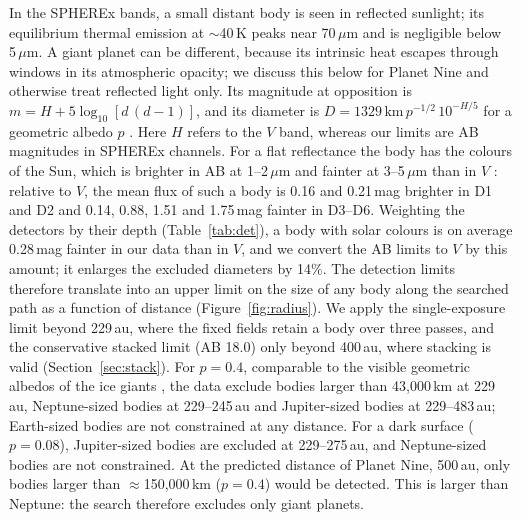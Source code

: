 \documentclass[twocolumn,linenumbers,anonymous]{aastex702}
\begin{document}
In the SPHEREx bands, a small distant body is seen in reflected sunlight; its equilibrium thermal emission at $\sim$40\,K peaks near 70\,$\mu$m and is negligible below 5\,$\mu$m. A giant planet can be different, because its intrinsic heat escapes through windows in its atmospheric opacity; we discuss this below for Planet Nine and otherwise treat reflected light only. Its magnitude at opposition is $m = H + 5\log_{10}[d\,(d - 1)]$, and its diameter is $D = 1329\,\mathrm{km}\,p^{-1/2}\,10^{-H/5}$ for a geometric albedo $p$ \citep{pravec07}. Here $H$ refers to the $V$ band, whereas our limits are AB magnitudes in SPHEREx channels. For a flat reflectance the body has the colours of the Sun, which is brighter in AB at 1--2\,$\mu$m and fainter at 3--5\,$\mu$m than in $V$ \citep{willmer18}: relative to $V$, the mean flux of such a body is 0.16 and 0.21\,mag brighter in D1 and D2 and 0.14, 0.88, 1.51 and 1.75\,mag fainter in D3--D6. Weighting the detectors by their depth (Table~\ref{tab:det}), a body with solar colours is on average 0.28\,mag fainter in our data than in $V$, and we convert the AB limits to $V$ by this amount; it enlarges the excluded diameters by 14\%. The detection limits therefore translate into an upper limit on the size of any body along the searched path as a function of distance (Figure~\ref{fig:radius}). We apply the single-exposure limit beyond 229\,au, where the fixed fields retain a body over three passes, and the conservative stacked limit (AB 18.0) only beyond 400\,au, where stacking is valid (Section~\ref{sec:stack}). For $p = 0.4$, comparable to the visible geometric albedos of the ice giants \citep{karkoschka94}, the data exclude bodies larger than 43{,}000\,km at 229\,au, Neptune-sized bodies at 229--245\,au and Jupiter-sized bodies at 229--483\,au; Earth-sized bodies are not constrained at any distance. For a dark surface ($p = 0.08$), Jupiter-sized bodies are excluded at 229--275\,au, and Neptune-sized bodies are not constrained. At the predicted distance of Planet Nine, 500\,au, only bodies larger than $\approx$150{,}000\,km ($p = 0.4$) would be detected. This is larger than Neptune: the search therefore excludes only giant planets.
\end{document}
